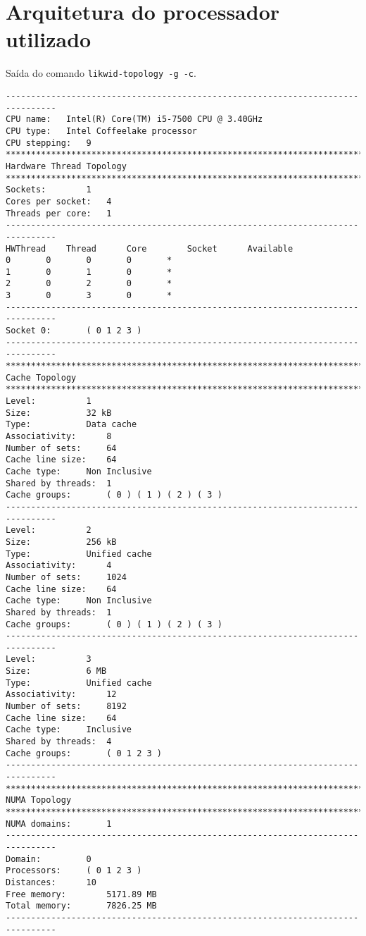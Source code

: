 \documentclass[a4paper, 11pt]{article}
\begin{document}
\section{Arquitetura do processador utilizado}
    Saída do comando \texttt{likwid-topology -g -c}.
    \begin{verbatim}
--------------------------------------------------------------------------------
CPU name:	Intel(R) Core(TM) i5-7500 CPU @ 3.40GHz
CPU type:	Intel Coffeelake processor
CPU stepping:	9
********************************************************************************
Hardware Thread Topology
********************************************************************************
Sockets:		1
Cores per socket:	4
Threads per core:	1
--------------------------------------------------------------------------------
HWThread	Thread		Core		Socket		Available
0		0		0		0		*
1		0		1		0		*
2		0		2		0		*
3		0		3		0		*
--------------------------------------------------------------------------------
Socket 0:		( 0 1 2 3 )
--------------------------------------------------------------------------------
********************************************************************************
Cache Topology
********************************************************************************
Level:			1
Size:			32 kB
Type:			Data cache
Associativity:		8
Number of sets:		64
Cache line size:	64
Cache type:		Non Inclusive
Shared by threads:	1
Cache groups:		( 0 ) ( 1 ) ( 2 ) ( 3 )
--------------------------------------------------------------------------------
Level:			2
Size:			256 kB
Type:			Unified cache
Associativity:		4
Number of sets:		1024
Cache line size:	64
Cache type:		Non Inclusive
Shared by threads:	1
Cache groups:		( 0 ) ( 1 ) ( 2 ) ( 3 )
--------------------------------------------------------------------------------
Level:			3
Size:			6 MB
Type:			Unified cache
Associativity:		12
Number of sets:		8192
Cache line size:	64
Cache type:		Inclusive
Shared by threads:	4
Cache groups:		( 0 1 2 3 )
--------------------------------------------------------------------------------
********************************************************************************
NUMA Topology
********************************************************************************
NUMA domains:		1
--------------------------------------------------------------------------------
Domain:			0
Processors:		( 0 1 2 3 )
Distances:		10
Free memory:		5171.89 MB
Total memory:		7826.25 MB
--------------------------------------------------------------------------------



\end{verbatim}
\end{document}
